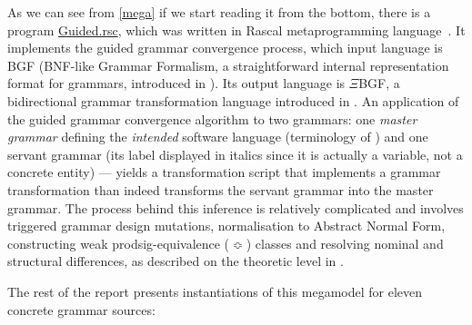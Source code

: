 \documentclass[a4paper]{report}
\begin{document}
As we can see from \autoref{mega} if we start reading it from the bottom, there is a program
\href{https://github.com/grammarware/slps/blob/master/shared/rascal/src/converge/Guided.rsc}{Guided.rsc}, which was
written in Rascal metaprogramming language~\cite{Rascal}. It implements the guided grammar convergence process, which
input language is BGF (BNF-like Grammar Formalism, a straightforward internal representation format for grammars,
introduced in \cite{Convergence2009}). Its output language is $\Xi$BGF, a bidirectional grammar transformation language
introduced in \cite{Metasyntactically2012}. An application of the guided grammar convergence algorithm to two grammars:
one \emph{master grammar} defining the \emph{intended} software language (terminology of \cite{Guided2013}) and one
servant grammar (its label displayed in italics since it is actually a variable, not a concrete entity) --- yields a
transformation script that implements a grammar transformation than indeed transforms the servant grammar into the
master grammar. The process behind this inference is relatively complicated and involves triggered grammar design
mutations, normalisation to Abstract Normal Form, constructing weak prodsig-equivalence ($\Bumpeq$) classes and
resolving nominal and structural differences, as described on the theoretic level in \cite{Guided2013}.

The rest of the report presents instantiations of this megamodel for eleven concrete grammar sources:
\end{document}
